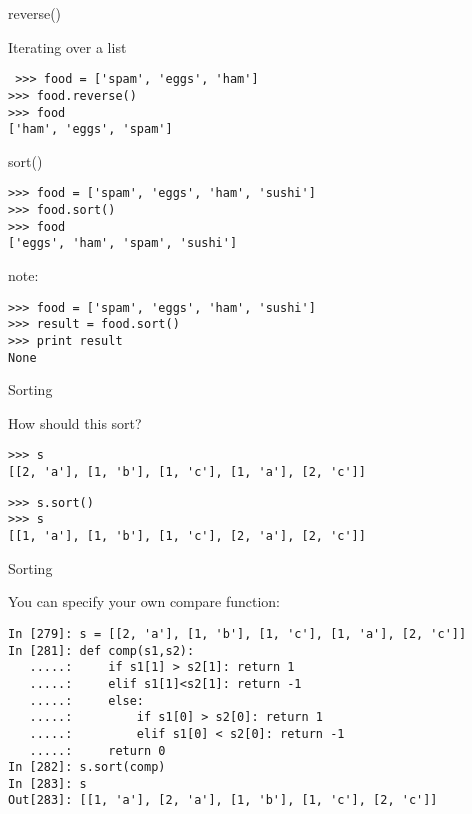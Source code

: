 \documentclass{beamer}
\begin{document}
\begin{frame}[fragile]{reverse()}

{\large Iterating over a list}

\begin{verbatim}
￼>>> food = ['spam', 'eggs', 'ham']
>>> food.reverse()
>>> food
['ham', 'eggs', 'spam']
\end{verbatim}

\end{frame} 

\begin{frame}[fragile]{sort()}

\vfill
\begin{verbatim}
>>> food = ['spam', 'eggs', 'ham', 'sushi']
>>> food.sort()
>>> food
['eggs', 'ham', 'spam', 'sushi']
\end{verbatim}

\vfill
{\Large note:}

\vfill
\begin{verbatim}
>>> food = ['spam', 'eggs', 'ham', 'sushi']
>>> result = food.sort()
>>> print result
None
\end{verbatim}

\vfill
\end{frame} 

\begin{frame}[fragile]{Sorting}

{\large How should this sort?}

\begin{verbatim}
>>> s
[[2, 'a'], [1, 'b'], [1, 'c'], [1, 'a'], [2, 'c']]
\end{verbatim}

\pause

\begin{verbatim}
>>> s.sort()
>>> s
[[1, 'a'], [1, 'b'], [1, 'c'], [2, 'a'], [2, 'c']]
\end{verbatim}

\end{frame} 

\begin{frame}[fragile]{Sorting}

{\large You can specify your own compare function:}

\begin{verbatim}
In [279]: s = [[2, 'a'], [1, 'b'], [1, 'c'], [1, 'a'], [2, 'c']]
In [281]: def comp(s1,s2):
   .....:     if s1[1] > s2[1]: return 1
   .....:     elif s1[1]<s2[1]: return -1
   .....:     else:
   .....:         if s1[0] > s2[0]: return 1
   .....:         elif s1[0] < s2[0]: return -1
   .....:     return 0
In [282]: s.sort(comp)
In [283]: s
Out[283]: [[1, 'a'], [2, 'a'], [1, 'b'], [1, 'c'], [2, 'c']]
\end{verbatim}
\end{frame} 
\end{document}
